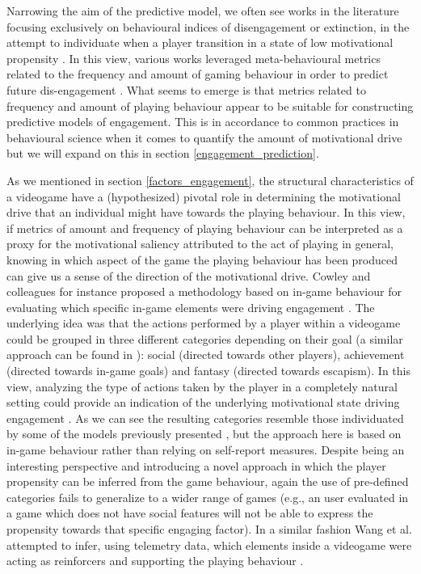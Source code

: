 Narrowing the aim of the predictive model, we often see works in the literature focusing exclusively on behavioural indices of disengagement or extinction, in the attempt to individuate when a player transition in a state of low motivational propensity \cite{el2021game}. In this view, various works leveraged meta-behavioural metrics related to the frequency and amount of gaming behaviour in order to predict future dis-engagement \cite{runge2014churn, kim2017churn, hadiji2014predicting}. What seems to emerge is that metrics related to frequency and amount of playing behaviour appear to be suitable for constructing predictive models of engagement. This is in accordance to common practices in behavioural science when it comes to quantify the amount of motivational drive \cite{cacioppo2007handbook} but we will expand on this in section \ref{engagement_prediction}. 

As we mentioned in section \ref{factors_engagement}, the structural characteristics of a videogame have a (hypothesized) pivotal role in determining the motivational drive that an individual might have towards the playing behaviour. In this view, if metrics of amount and frequency of playing behaviour can be interpreted as a proxy for the motivational saliency attributed to the act of playing in general, knowing in which aspect of the game the playing behaviour has been produced can give us a sense of the direction of the motivational drive. Cowley and colleagues for instance proposed a methodology based on in-game behaviour for evaluating which specific in-game elements were driving engagement \cite{cowley2016behavlets}. The underlying idea was that the actions performed by a player within a videogame could be grouped in three different categories depending on their goal (a similar approach can be found in \cite{bartle1996hearts}): social (directed towards other players), achievement (directed towards in-game goals) and fantasy (directed towards escapism). In this view, analyzing the type of actions taken by the player in a completely natural setting could provide an indication of the underlying motivational state driving engagement \cite{cowley2016behavlets}. As we can see the resulting categories resemble those individuated by some of the models previously presented \cite{yee2006motivations, bartle1996hearts}, but the approach here is based on in-game behaviour rather than relying on self-report measures. Despite being an interesting perspective and introducing a novel approach in which the player propensity can be inferred from the game behaviour, again the use of pre-defined categories fails to generalize to a wider range of games (e.g., an user evaluated in a game which does not have social features will not be able to express the propensity towards that specific engaging factor). In a similar fashion Wang et al. attempted to infer, using telemetry data, which elements inside a videogame were acting as reinforcers and supporting the playing behaviour \cite{wang2018beyond}. 

